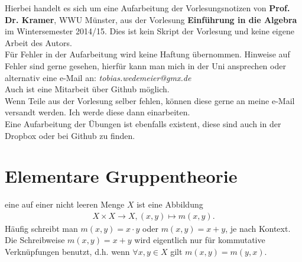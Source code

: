 \maketitle
\thispagestyle{empty}
\newpage

\thispagestyle{empty}
\vspace*{\fill}
\begin{center}
	Hierbei handelt es sich um eine Aufarbeitung der Vorlesungsnotizen von \textbf{Prof. Dr. Kramer}, WWU Münster, aus der Vorlesung \textbf{Einführung in die Algebra} im Wintersemester 2014/15. Dies ist kein Skript der Vorlesung und keine eigene Arbeit des Autors.\\
	\vspace{2cm}
	Für Fehler in der Aufarbeitung wird keine Haftung übernommen. Hinweise auf Fehler sind gerne gesehen, hierfür kann man mich in der Uni ansprechen oder alternativ eine e-Mail an: \textit{tobias.wedemeier@gmx.de}\\
	Auch ist eine Mitarbeit über Github möglich.\\
	\vspace{2cm}
	Wenn Teile aus der Vorlesung selber fehlen, können diese gerne an meine e-Mail versandt werden. Ich werde diese dann einarbeiten.\\
	\vspace{2cm}
	Eine Aufarbeitung der Übungen ist ebenfalls existent, diese sind auch in der Dropbox oder bei Github zu finden.
\end{center}
\vspace*{\fill}
\newpage


\tableofcontents
\cleardoubleoddemptypage %

\setcounter{page}{1}

\section{Elementare Gruppentheorie}
\label{sec:elementare_gruppentheorie}

 eine  auf einer nicht leeren Menge $X$ ist eine Abbildung
\begin{equation*}
\begin{aligned}
X\times X \to X , (x,y) \mapsto m(x,y).
\end{aligned}
\end{equation*}
Häufig schreibt man $m(x,y)= x\cdot y$ oder $ m(x,y) = x + y$, je nach Kontext. Die Schreibweise $m(x,y)=x+y$ wird eigentlich nur für kommutative Verknüpfungen benutzt, d.h. wenn $\forall x,y\in X$ gilt $m(x,y)=m(y,x)$.

